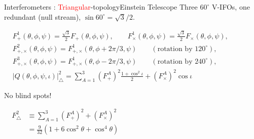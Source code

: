 \documentclass[xcolor=dvipsnames,handout,t]{beamer}
\newcommand{\red}[1]{\textcolor{red}{#1}}
\newcommand{\f}{\frac}
\begin{document}
\begin{frame}{Interferometers : \red{Triangular}-topology}{Einstein Telescope}
  \vspace{-2mm}
  Three $60^\circ$ V-IFOs, one redundant (null stream), $\sin 60^\circ =\sqrt{3}/2$.
  \begin{footnotesize}
  \begin{align*}
    &F^1_+(\theta,\phi,\psi)= \f{\sqrt{3}}{2} F_+(\theta,\phi,\psi), \qquad F^1_\times(\theta,\phi,\psi)= \f{\sqrt{3}}{2} F_\times(\theta,\phi,\psi),\hspace{2cm}\\
    & F^2_{+,\times}(\theta,\phi,\psi) = F^1_{+,\times}(\theta,\phi+2\pi/3,\psi)\qquad (\text{rotation by 120}^\circ),\\
    & F^3_{+,\times}(\theta,\phi,\psi) = F^1_{+,\times}(\theta,\phi-2\pi/3,\psi) \qquad(\text{rotation by 240}^\circ),\\
    &  |Q(\theta,\phi,\psi,\iota)|_\bigtriangleup^2 = \sum_{A=1}^3 \left(F^A_+\right)^2\f{1+\cos^2\iota}{2}  + \left(F^A_\times\right)^2 \cos\iota
    \end{align*}
    \end{footnotesize}
   {
      No blind spots!
      \begin{footnotesize}
      \begin{align*}
      F^2_\bigtriangleup &\equiv \sum_{A=1}^3 \left(F^A_+\right)^2+\left(F^A_\times\right)^2 \hspace{8cm}\\ 
      &= \f{9}{32}\left(1+6\cos^2\theta + \cos^4\theta\right)
      \end{align*}
      \end{footnotesize}
  }
\end{frame}
\end{document}
